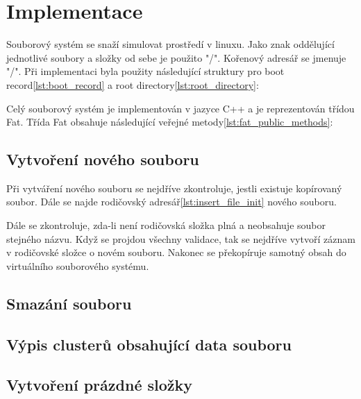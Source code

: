 \documentclass{report}
\begin{document}
\chapter*{Implementace}
Souborový systém se snaží simulovat prostředí v linuxu. Jako znak oddělující jednotlivé soubory a složky od sebe je použito "/". Kořenový adresář se jmenuje "/". Při implementaci byla použity následující struktury pro boot record\ref{lst:boot_record} a root directory\ref{lst:root_directory}:


Celý souborový systém je implementován v jazyce C++ a je reprezentován třídou Fat. Třída Fat obsahuje následující veřejné metody\ref{lst:fat_public_methods}:


\section*{Vytvoření nového souboru}
Při vytváření nového souboru se nejdříve zkontroluje, jestli existuje kopírovaný soubor. Dále se najde rodičovský adresář\ref{lst:insert_file_init} nového souboru.

Dále se zkontroluje, zda-li není rodičovská složka plná a neobsahuje soubor stejného názvu. Když se projdou všechny validace, tak se nejdříve vytvoří záznam v rodičovské složce o novém souboru. Nakonec se překopíruje samotný obsah do virtuálního souborového systému.

\section*{Smazání souboru}

\section*{Výpis clusterů obsahující data souboru}

\section*{Vytvoření prázdné složky}
\end{document}
